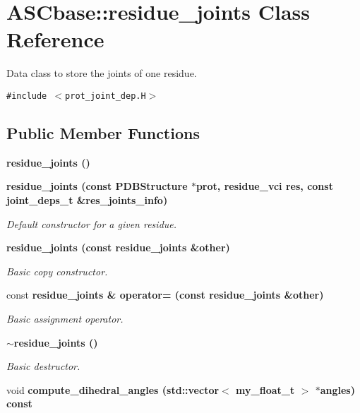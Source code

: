 \section{ASCbase::residue\_\-joints Class Reference}
\label{classASCbase_1_1residue__joints}
Data class to store the joints of one residue.  


{\tt \#include $<$prot\_\-joint\_\-dep.H$>$}

\subsection*{Public Member Functions}
\begin{CompactItemize}
\item 
\bf{residue\_\-joints} ()
\item 
\bf{residue\_\-joints} (const \bf{PDBStructure} $\ast$prot, residue\_\-vci res, const joint\_\-deps\_\-t \&res\_\-joints\_\-info)\label{classASCbase_1_1residue__joints_8c38f7e8122a28e0153347a1dfe1b30c}

\begin{CompactList}\small\item\em Default constructor for a given residue. \item\end{CompactList}\item 
\bf{residue\_\-joints} (const \bf{residue\_\-joints} \&other)\label{classASCbase_1_1residue__joints_f449cdad0ca876373713c618657b0015}

\begin{CompactList}\small\item\em Basic copy constructor. \item\end{CompactList}\item 
const \bf{residue\_\-joints} \& \bf{operator=} (const \bf{residue\_\-joints} \&other)\label{classASCbase_1_1residue__joints_a2cac3126dd4e9d9909fca1d3de2a53a}

\begin{CompactList}\small\item\em Basic assignment operator. \item\end{CompactList}\item 
\bf{$\sim$residue\_\-joints} ()\label{classASCbase_1_1residue__joints_d09831082869cc7230c1c6315615e33b}

\begin{CompactList}\small\item\em Basic destructor. \item\end{CompactList}\item 
void \bf{compute\_\-dihedral\_\-angles} (std::vector$<$ my\_\-float\_\-t $>$ $\ast$angles) const \label{classASCbase_1_1residue__joints_43413c481de3d0a00b610b8c445405cd}


\end{CompactItemize}
